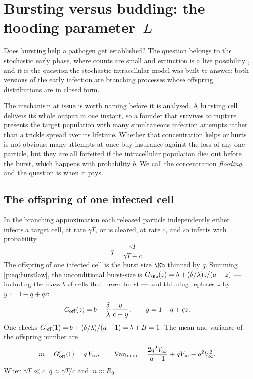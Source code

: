 \FloatBarrier

\section{Bursting versus budding: the flooding parameter~\texorpdfstring{$L$}{L}}
\label{p:sec:flooding}

Does bursting help a pathogen get established? The question belongs to the
stochastic early phase, where counts are small and extinction is a live
possibility \cite{pearson2011stochastic}, and it is the question the
stochastic intracellular model was built to answer: both versions of the
early infection are branching processes whose offspring distributions are in
closed form.

The mechanism at issue is worth naming before it is analysed. A bursting
cell delivers its whole output in one instant, so a founder that survives to
rupture presents the target population with many simultaneous infection
attempts rather than a trickle spread over its lifetime. Whether that
concentration helps or hurts is not obvious: many attempts at once buy
insurance against the loss of any one particle, but they are all forfeited
if the intracellular population dies out before the burst, which happens
with probability $b$. We call the concentration \emph{flooding}, and the
question is when it pays.

\subsection{The offspring of one infected cell}

In the branching approximation each released particle independently either
infects a target cell, at rate $\gamma T$, or is cleared, at rate $c$, and so
infects with probability
\begin{equation}
q=\frac{\gamma T}{\gamma T+c}.
\label{p:eq:q}
\end{equation}
The offspring of one infected cell is the burst size $\Kb$ thinned by $q$.
Summing \cref{p:eq:burstlaw}, the unconditional burst-size \pgf{} is
$G_{\Kb}(z)=b+(\delta/\lambda)z/(a-z)$ --- including the mass $b$ of cells
that never burst --- and thinning replaces $z$ by $y:=1-q+qz$:
\begin{equation}
G_{\rm off}(z)=b+\frac{\delta}{\lambda}\,\frac{y}{a-y},
\qquad y=1-q+qz.
\label{p:eq:Goff}
\end{equation}
One checks $G_{\rm off}(1)=b+(\delta/\lambda)/(a-1)=b+B=1$. The mean and
variance of the offspring number are
\begin{equation}
m=G_{\rm off}'(1)=q\,V_\infty,
\qquad
\mathrm{Var}_{\rm burst}
=\frac{2q^2V_\infty}{a-1}+qV_\infty-q^2V_\infty^2.
\label{p:eq:offmoments}
\end{equation}
When $\gamma T\ll c$, $q\approx\gamma T/c$ and $m\approx R_0$.

